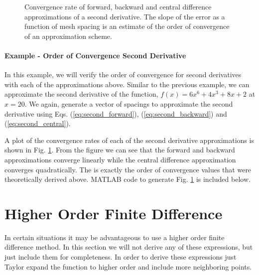 \begin{figure}[t]
\sidecaption[t]
\scalebox{0.5}{}
\caption{Convergence rate of forward, backward and central difference approximations of  a second derivative. The slope of the error as a function of mesh spacing is an estimate of the order of convergence of an approximation scheme.}
\label{fig:fdm_approx_2}
\end{figure}

\paragraph{Example - Order of Convergence Second Derivative}

In this example, we will verify the order of convergence for second derivatives with each of the approximations above. 
Similar to the previous example, we can approximate the second derivative of the function, $f\left(x\right) = 6x^{6} + 
4x^{3} + 8x + 2$  at $x=20$.  We again, generate a vector of spacings to approximate the second derivative using Eqs.
(\ref{eq:second_forward}), (\ref{eq:second_backward}) and (\ref{eq:second_central}).
\par
A plot of the convergence rates of each of the second derivative approximations is shown in Fig. \ref{fig:fdm_approx_2}.
From the figure we can see that the forward and backward approximations converge linearly while the central difference
approximation converges quadratically.  The is exactly the order of convergence values that were theoretically derived
above.  MATLAB code to generate Fig. \ref{fig:fdm_approx_2} is included below.


\section{Higher Order Finite Difference}
     In certain situations it may be advantageous to use a higher order finite difference method.  In this section we will not
derive any of these expressions, but just include them for completeness.  In order to derive these expressions just Taylor
expand the function to higher order and include more neighboring points.

